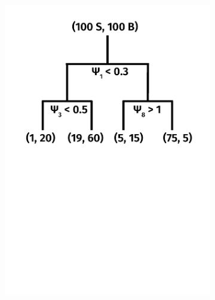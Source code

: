 \begin{figure}[]
\begin{center}
\begin{subfigure}[t]{0.32\textwidth}
            \includegraphics[width=\textwidth]{figures/toptagging/bdt/tree1.pdf}
        \end{subfigure}
        \begin{subfigure}[t]{0.32\textwidth}

\end{subfigure}
\end{center}
\end{figure}
